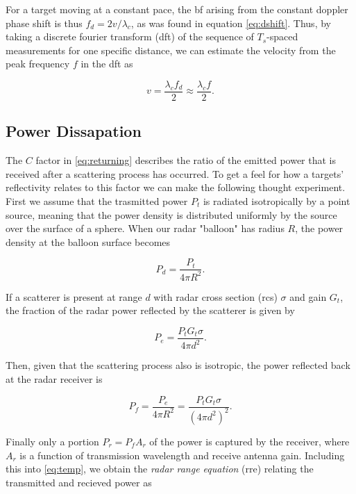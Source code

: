For a target moving at a constant pace, the \gls{bf} arising from the constant doppler phase shift is thus $f_d = 2v/\lambda_c$, as was found in equation \eqref{eq:dshift}. Thus, by taking a discrete fourier transform (\gls{dft}) of the sequence of $T_s$-spaced measurements for one specific distance, we can estimate the velocity from the peak frequency $f$ in the \gls{dft} as 

\begin{equation}\label{eq:dopp}
	v = \frac{\lambda_c f_d}{2}
	\approx \frac{\lambda_c f}{2}.
\end{equation}


\subsection{Power Dissapation}

The $C$ factor in \eqref{eq:returning} describes the ratio of the emitted power that is received after a scattering process has occurred. To get a feel for how a targets' reflectivity relates to this factor we can make the following thought experiment. First we assume that the trasmitted power $P_t$ is radiated isotropically by a point source, meaning that the power density is distributed uniformly by the source over the surface of a sphere. When our radar "balloon" has radius $R$, the power density at the balloon surface becomes  \citep{amin_2017}

\begin{equation}
	P_d 
	= \frac{P_t}{4\pi R^2}.
\end{equation}

If a scatterer is present at range $d$ with radar cross section (\gls{rcs}) $\sigma$ and gain $G_t$, the fraction of the radar power reflected by the scatterer is given by 

\begin{equation}
	P_{e}
	= \frac{P_tG_t\sigma}{4\pi d^2}.
\end{equation}

Then, given that the scattering process also is isotropic, the power reflected back at the radar receiver is

\begin{equation}\label{eq:temp}
	P_f 
	= \frac{P_e}{4\pi R^2} 
	= \frac{P_t G_t \sigma}{(4\pi d^2)^2}.
\end{equation}

Finally only a portion $P_r = P_fA_r$ of the power is captured by the receiver, where $A_r$ is a function of transmission wavelength and receive antenna gain. Including this into \eqref{eq:temp}, we obtain the \emph{radar range equation} (\gls{rre}) relating the transmitted and recieved power as

